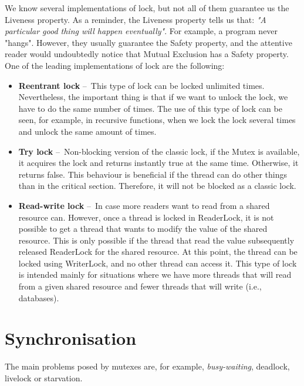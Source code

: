 We know several implementations of lock, but not all of them guarantee us the Liveness property. As a reminder, the Liveness property tells us that: \emph{"A particular good thing will happen eventually"}. For example, a program never "hangs". However, they usually guarantee the Safety property, and the attentive reader would undoubtedly notice that Mutual Exclusion has a Safety property. One of the leading implementations of lock are the following:
\begin {itemize}
	\item \textbf{Reentrant lock} \---\ This type of lock can be locked unlimited times. Nevertheless, the important thing is that if we want to unlock the lock, we have to do the same number of times. The use of this type of lock can be seen, for example, in recursive functions, when we lock the lock several times and unlock the same amount of times.
	\item \textbf{Try lock} \---\ Non-blocking version of the classic lock, if the Mutex is available, it acquires the lock and returns instantly true at the same time. Otherwise, it returns false. This behaviour is beneficial if the thread can do other things than in the critical section. Therefore, it will not be blocked as a classic lock.
	\item \textbf{Read-write lock} \---\ In case more readers want to read from a shared resource can. However, once a thread is locked in ReaderLock, it is not possible to get a thread that wants to modify the value of the shared resource. This is only possible if the thread that read the value subsequently released ReaderLock for the shared resource. At this point, the thread can be locked using WriterLock, and no other thread can access it. This type of lock is intended mainly for situations where we have more threads that will read from a given shared resource and fewer threads that will write (i.e., databases).
\end{itemize}

\section{Synchronisation}
\label{04:synchronization}

The main problems posed by mutexes are, for example, \emph {busy-waiting}, deadlock, livelock or starvation.

